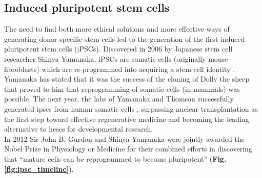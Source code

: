 \subsection{Induced pluripotent stem cells}
\label{sec:ipsc}

The need to find both more ethical solutions and more effective ways of generating donor-specific stem cells  led to the generation of the first induced pluripotent stem cells (iPSCs).
Discovered in 2006 by Japanese stem cell researcher Shinya Yamanaka, iPSCs are somatic cells (originally mouse fibroblasts) which are re-programmed into acquiring a stem-cell identity \cite{takahashi2006induction}.
Yamanaka has stated that it was the success of the cloning of Dolly the sheep that proved to him that reprogramming of somatic cells (in mammals) was possible.
The next year, the labs of Yamanaka and Thomson successfully generated \glspl{ipsc} from human somatic cells \cite{takahashi2006induction, takahashi2007induction, yu2007induced}, surpassing nuclear transplantation as the first step toward effective regenerative medicine and becoming the leading alternative to \glspl{hesc} for developmental research.\\

In 2012 Sir John B. Gurdon and Shinya Yamanaka were jointly awarded the Nobel Prize in Physiology or Medicine for their combined efforts in discovering that “mature cells can be reprogrammed to become pluripotent” \cite{nobel2012press} (\textbf{Fig. \ref{fig:ipsc_timeline}}).    






